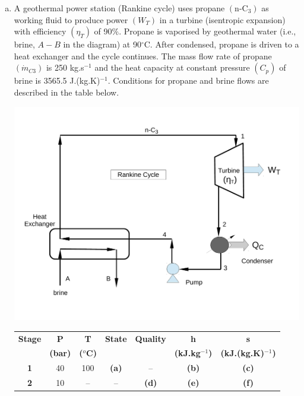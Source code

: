 \documentclass[calculator,steamtables,refrigeranttables,psychrometricchart,datasheet]{exam}
\begin{document}
\begin{question}
%
\begin{enumerate}[(a)]
\item  A geothermal power station (Rankine cycle) uses propane $\left(\text{n-C}_{3}\right)$ as working fluid to produce power $\left(W_{T}\right)$ in a turbine (isentropic expansion) with efficiency $\left(\eta_{T}\right)$ of 90$\%$. Propane is vaporised by geothermal water (i.e., brine, $A-B$ in the diagram) at 90$^{\circ}$C. After condensed, propane is driven to a heat exchanger and the cycle continues. The mass flow rate of propane $\left(\dot{m}_{C3}\right)$ is 250 kg.s$^{-1}$ and the heat capacity at constant pressure $\left(C_{p}\right)$ of brine is 3565.5 J.(kg.K)$^{-1}$. Conditions for propane and brine flows are described in the table below.
\begin{center}
\includegraphics[width=10.cm,height=7.cm,clip]{./Pics/RankineCycle}
\end{center} 
\begin{center}
\begin{tabular} {||c | c c c c c c || }
\hline\hline
{\bf Stage} & {\bf P}    & {\bf T}        & {\bf State}    &  {\bf Quality }     &  {\bf h}             & {\bf s}                  \\
            & {\bf (bar)}& {\bf ($^{o}$C)} &               &                     & {\bf (kJ.kg$^{-1}$)}  & {\bf (kJ.(kg.K)$^{-1}$)}  \\
\hline\hline
 {\bf 1 }   & 40         & 100            &   {\bf (a)}    &    --               & {\bf (b)}           & {\bf (c)}                \\
 {\bf 2 }   & 10         &  --            &   --           & {\bf (d)}           & {\bf (e)}           & {\bf (f)}                 \\

\end{tabular}
\end{center}
\end{enumerate}
\end{question}
\end{document}
